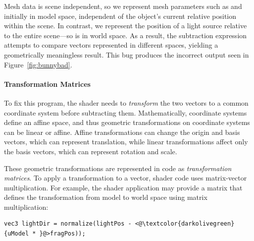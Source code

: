 Mesh data is scene independent, so we represent mesh parameters such as  and  initially in model space, independent of the object's current relative position within the scene.
In contrast, we represent the position of a light source relative to the entire scene---so  is in world space.
As a result, the subtraction expression  attempts to compare vectors represented in different spaces, yielding a geometrically meaningless result.
This bug produces the incorrect output seen in Figure~\ref{fig:bunnybad}.

\paragraph {Transformation Matrices} To fix this program, the shader needs to \emph{transform} the two vectors to a common coordinate system before subtracting them. 
Mathematically, coordinate systems define an affine space, and thus geometric transformations on coordinate systems can be linear or affine.
Affine transformations can change the origin and basis vectors, which can represent translation, while linear transformations affect only the basis vectors, which can represent rotation and scale. 

These geometric transformations are represented in code as \emph{transformation matrices}.
To apply a transformation to a vector, shader code uses matrix-vector multiplication. 
For example, the shader application may provide a matrix  that defines the transformation from model to world space using matrix multiplication:
\begin{lstlisting}
vec3 lightDir = normalize(lightPos - <@\textcolor{darkolivegreen}{uModel * }@>fragPos));
\end{lstlisting}

